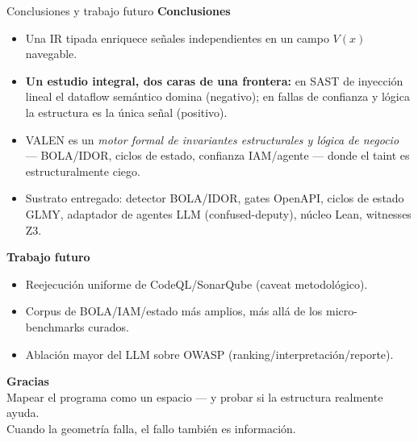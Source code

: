 \documentclass[aspectratio=169,11pt]{beamer}
\begin{document}
\begin{frame}{Conclusiones y trabajo futuro}
  \textbf{Conclusiones}
  \begin{itemize}
    \item Una IR tipada enriquece señales independientes en un campo $V(x)$ navegable.
    \item \textbf{Un estudio integral, dos caras de una frontera:} en SAST de
          inyección lineal el dataflow semántico domina (negativo); en fallas de
          confianza y lógica la estructura es la única señal (positivo).
    \item VALEN es un \emph{motor formal de invariantes estructurales y lógica de
          negocio} --- BOLA/IDOR, ciclos de estado, confianza IAM/agente --- donde
          el taint es estructuralmente ciego.
    \item Sustrato entregado: detector BOLA/IDOR, gates OpenAPI, ciclos de estado
          GLMY, adaptador de agentes LLM (confused-deputy), núcleo Lean, witnesses Z3.
  \end{itemize}
  \vspace{2mm}
  \textbf{Trabajo futuro}
  \begin{itemize}
    \item Reejecución uniforme de CodeQL/SonarQube (caveat metodológico).
    \item Corpus de BOLA/IAM/estado más amplios, más allá de los micro-benchmarks curados.
    \item Ablación mayor del LLM sobre OWASP (ranking/interpretación/reporte).
  \end{itemize}
\end{frame}

\begin{frame}
  \centering
  \Large\color{valen}\textbf{Gracias}\\[4mm]
  \normalsize\color{black}
  Mapear el programa como un espacio --- y probar si la estructura realmente ayuda.\\[1mm]
  Cuando la geometría falla, el fallo también es información.
\end{frame}
\end{document}
